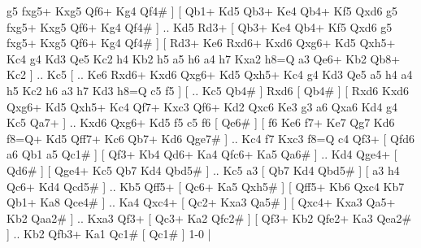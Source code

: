g5  fxg5+ Kxg5  Qf6+ Kg4  Qf4#   ]  [  Qb1+ Kd5  Qb3+ Ke4  Qb4+ Kf5  Qxd6 g5  fxg5+ Kxg5  Qf6+ Kg4  Qf4#   ] .. Kd5    Rd3+ [  Qb3+ Ke4  Qb4+ Kf5  Qxd6 g5  fxg5+ Kxg5  Qf6+ Kg4  Qf4#   ]  [  Rd3+ Ke6  Rxd6+ Kxd6  Qxg6+ Kd5  Qxh5+ Kc4  g4 Kd3  Qe5 Kc2  h4 Kb2  h5 a5  h6 a4  h7 Kxa2  h8=Q a3  Qe6+ Kb2  Qb8+ Kc2   ] .. Kc5 [ .. Ke6  Rxd6+ Kxd6  Qxg6+ Kd5  Qxh5+ Kc4  g4 Kd3  Qe5 a5  h4 a4  h5 Kc2  h6 a3  h7 Kd3  h8=Q c5  f5   ]  [ .. Kc5  Qb4#   ]  Rxd6 [  Qb4#   ]  [  Rxd6 Kxd6  Qxg6+ Kd5  Qxh5+ Kc4  Qf7+ Kxc3  Qf6+ Kd2  Qxc6 Ke3  g3 a6  Qxa6 Kd4  g4 Kc5  Qa7+   ] .. Kxd6    Qxg6+   Kd5    f5   c5    f6 [  Qe6#   ]  [  f6 Ke6  f7+ Ke7  Qg7 Kd6  f8=Q+ Kd5  Qff7+ Kc6  Qb7+ Kd6  Qge7#   ] .. Kc4    f7   Kxc3    f8=Q   c4    Qf3+ [  Qfd6 a6  Qb1 a5  Qc1#   ]  [  Qf3+ Kb4  Qd6+ Ka4  Qfc6+ Ka5  Qa6#   ] .. Kd4    Qge4+ [  Qd6#   ]  [  Qge4+ Kc5  Qb7 Kd4  Qbd5#   ] .. Kc5   a3 [  Qb7 Kd4  Qbd5#   ]  [  a3 h4  Qc6+ Kd4  Qcd5#   ] .. Kb5    Qff5+ [  Qc6+ Ka5  Qxh5#   ]  [  Qff5+ Kb6  Qxc4 Kb7  Qb1+ Ka8  Qce4#   ] .. Ka4    Qxc4+ [  Qc2+ Kxa3  Qa5#   ]  [  Qxc4+ Kxa3  Qa5+ Kb2  Qaa2#   ] .. Kxa3   Qf3+ [  Qc3+ Ka2  Qfc2#   ]  [  Qf3+ Kb2  Qfe2+ Ka3  Qea2#   ] .. Kb2   Qfb3+   Ka1   Qc1#    [  Qc1#   ] 1-0  |
